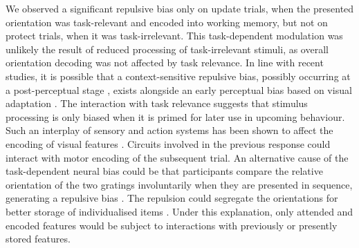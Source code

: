 \documentclass{article}
\begin{document}
\begin{large}
We observed a significant repulsive bias only on update trials, when the presented orientation was task-relevant and encoded into working memory, but not on protect trials, when it was task-irrelevant. This task-dependent modulation was unlikely the result of reduced processing of task-irrelevant stimuli, as overall orientation decoding was not affected by task relevance. In line with recent studies, it is possible that a context-sensitive repulsive bias, possibly occurring at a post-perceptual stage \parencite{Zamboni2016, Fritsche2019}, exists alongside an early perceptual bias based on visual adaptation \parencite{Fritsche2017}. The interaction with task relevance suggests that stimulus processing is only biased when it is primed for later use in upcoming behaviour. Such an interplay of sensory and action systems has been shown to affect the encoding of visual features \parencite{VanEde2019, Boettcher2021, Myers2017a}. Circuits involved in the previous response could interact with motor encoding of the subsequent trial. An alternative cause of the task-dependent neural bias could be that participants compare the relative orientation of the two gratings involuntarily when they are presented in sequence, generating a repulsive bias \parencite{Bae2017, Czoschke2019, Czoschke2020, Chunharas2019}. The repulsion could segregate the orientations for better storage of individualised items \parencite[e.g. ][]{Wei2012}. Under this explanation, only attended and encoded features would be subject to interactions with previously or presently stored features.


\end{large}
\end{document}

